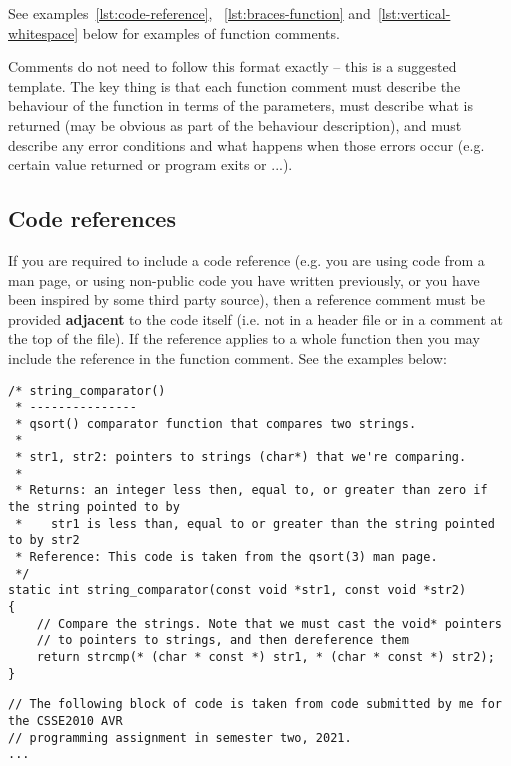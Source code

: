 \documentclass{article}
\begin{document}
See examples~\ref{lst:code-reference}, ~\ref{lst:braces-function} and~\ref{lst:vertical-whitespace} below for examples of function 
comments.

Comments do not need to follow this format exactly -- this is a suggested template. The key thing is that each function comment 
must describe the behaviour of the function in terms of the parameters, must describe what is returned (may be obvious as 
part of the behaviour description), and must describe any error conditions and what happens when those errors occur (e.g.
certain value returned or program exits or ...).

\subsection{Code references}
If you are required to include a code reference (e.g. you are using code from a man page, or using non-public code you have 
written previously, or you have been inspired by some third party source), then a reference comment must be provided
\textbf{adjacent} to the code itself (i.e. not in a header file or in a comment at the top of the file). If the reference applies to a whole
function then you may include the reference in the function comment. See the examples below:
 
\begin{lstlisting}
/* string_comparator()
 * ---------------
 * qsort() comparator function that compares two strings.
 *
 * str1, str2: pointers to strings (char*) that we're comparing. 
 *
 * Returns: an integer less then, equal to, or greater than zero if the string pointed to by 
 *    str1 is less than, equal to or greater than the string pointed to by str2
 * Reference: This code is taken from the qsort(3) man page.
 */
static int string_comparator(const void *str1, const void *str2)
{
    // Compare the strings. Note that we must cast the void* pointers
    // to pointers to strings, and then dereference them
    return strcmp(* (char * const *) str1, * (char * const *) str2);
}
\end{lstlisting}

\begin{lstlisting}
// The following block of code is taken from code submitted by me for the CSSE2010 AVR 
// programming assignment in semester two, 2021. 
...
\end{lstlisting}
\end{document}
